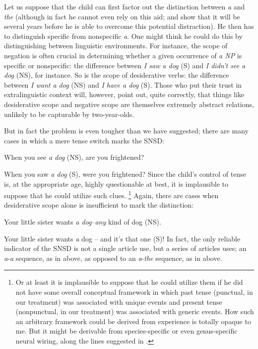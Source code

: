 Let us suppose that the child can first factor out the distinction between \textit{a} and \textit{the} (although in fact he cannot even rely on this aid; \citet{Warden1976} and \citet{Karmiloff-Smith1979} show that it will be several years before he is able to overcome this potential distraction). He then has to distinguish specific from nonspecific \textit{a}. One might think he could do this by distinguishing between linguistic environ\-ments. For instance, the scope of negation is often crucial in determin\-ing whether a given occurrence of \textit{a NP} is specific or nonspecific: the difference between \textit{I saw a dog} (S) and \textit{I didn't see a dog} (NS), for instance. So is the scope of desiderative verbs: the difference between \textit{I want a dog} (NS) and \textit{I have a dog} (S). Those who put their trust in extralinguistic context will, however, point out, quite correctly, that things like desiderative scope and negative scope are themselves ex\-tremely abstract relations, unlikely to be capturable by two-year-olds.

But in fact the problem is even tougher than we have suggested; there are many cases in which a mere tense switch marks the SNSD:

\ea\label{ex:3:11}
 When you see \textit{a dog} (NS), are you frightened? 
\z

\ea\label{ex:3:12}
 When you saw \textit{a dog} (S), were you frightened? 
\z
Since the child's control of tense is, at the appropriate age, highly questionable at best, it is implausible to suppose that he could utilize such clues.
\footnote{Or at least it is implausible to suppose that he could utilize them if he did not have some overall conceptual framework in which past tense (punctual, in our treatment) was associated with unique events and present tense (nonpunctual, in our treatment) was associ\-ated with generic events. How such an arbitrary framework could be derived from experience is totally opaque to me. But it might be derivable from species-specific or even genus-specific neural wiring, along the lines suggested in .}
Again, there are cases when desiderative scope alone is insufficient to mark the distinction:

\ea\label{ex:3:13}
 Your little sister wants \textit{a dog}--\textit{any} kind of dog (NS). 
\z

\ea\label{ex:3:14}
 Your little sister wants \textit{a} dog -- and it's that one (S)! 
\z
In fact, the only reliable indicator of the SNSD is not a single article use, but a series of articles uses; an \textit{a}-\textit{a} sequence, as in  above, as opposed to an \textit{a}-\textit{the} sequence, as in  above.

